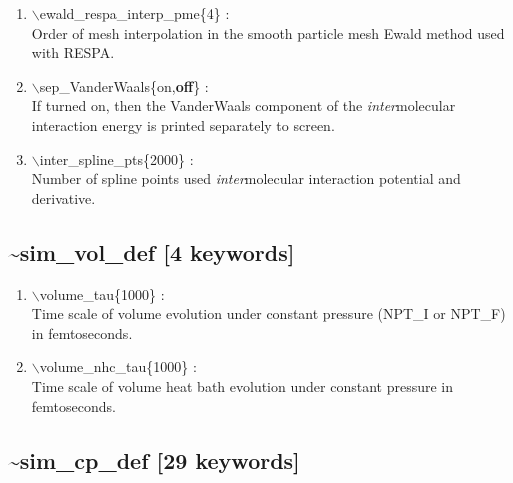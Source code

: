 \documentclass[12pt,titlepage]{article}
\begin{document}
\begin{enumerate}
 \vspace{0.15in} 
 \item   $\backslash$ewald\_respa\_interp\_pme\{4\} : \\
  Order of mesh interpolation in the smooth particle mesh Ewald method used
  with RESPA.

 \vspace{0.15in}
 \item   $\backslash$sep\_VanderWaals\{on,{\bf off}\} : \\
   If turned on, then the VanderWaals component of the {\it inter}molecular 
   interaction energy is printed separately to screen.

 \vspace{0.15in} 
 \item   $\backslash$inter\_spline\_pts\{2000\} : \\
    Number of spline points used {\it inter}molecular interaction 
    potential and derivative.

\end{enumerate}

\newpage
\subsection*{\bf \~{}sim\_vol\_def [4 keywords]}

\begin{enumerate}

 \vspace{0.15in} 
 \item  $\backslash$volume\_tau\{1000\} : \\
     Time scale of volume evolution
     under constant pressure (NPT\_I or NPT\_F) in femtoseconds.
  
 \vspace{0.15in} 
 \item  $\backslash$volume\_nhc\_tau\{1000\} : \\
     Time scale of volume 
     heat bath evolution under constant pressure in femtoseconds.

\end{enumerate}

\newpage
\subsection*{\bf \~{}sim\_cp\_def [29 keywords]}
\end{document}

